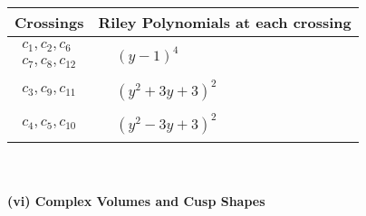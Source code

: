 \documentclass[1p]{elsarticle_modified}
\theoremstyle{definition}
\begin{document}
\begin{tabular}{m{50pt}|m{274pt}}
Crossings & \hspace{64pt}Riley Polynomials at each crossing \\
\hline $$\begin{aligned}c_{1},c_{2},c_{6}\\c_{7},c_{8},c_{12}\end{aligned}$$&$\begin{aligned}
&(y-1)^4
\end{aligned}$\\
\hline $$\begin{aligned}c_{3},c_{9},c_{11}\end{aligned}$$&$\begin{aligned}
&(y^2+3 y+3)^2
\end{aligned}$\\
\hline $$\begin{aligned}c_{4},c_{5},c_{10}\end{aligned}$$&$\begin{aligned}
&(y^2-3 y+3)^2
\end{aligned}$\\
\hline
\end{tabular}\\~\\
\newpage\flushleft \textbf{(vi) Complex Volumes and Cusp Shapes}
\end{document}
